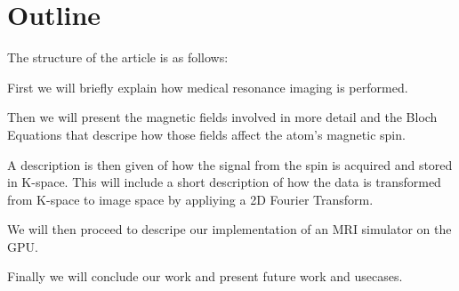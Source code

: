 



\section{Outline}

The structure of the article is as follows:

First we will briefly explain how medical resonance imaging is
performed.

Then we will present the magnetic fields involved in more detail and
the Bloch Equations that descripe how those fields affect the atom's
magnetic spin.

A description is then given of how the signal from the spin is
acquired and stored in K-space. This will include a short description
of how the data is transformed from K-space to image space by
appliying a 2D Fourier Transform.

We will then proceed to descripe our implementation of an MRI
simulator on the GPU.

Finally we will conclude our work and present future work and
usecases.

